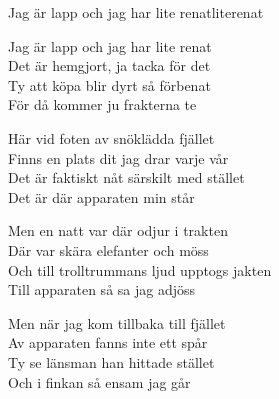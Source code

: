 \begin{song}{Jag är lapp och jag har lite renat}{literenat}
\begin{vers}
Jag är lapp och jag har lite renat\\
Det är hemgjort, ja tacka för det\\
Ty att köpa blir dyrt så förbenat\\
För då kommer ju frakterna te\\
\end{vers}
\begin{vers}
Här vid foten av snöklädda fjället\\
Finns en plats dit jag drar varje vår\\
Det är faktiskt nåt särskilt med stället\\
Det är där apparaten min står\\
\end{vers}
\begin{vers}
Men en natt var där odjur i trakten\\
Där var skära elefanter och möss\\
Och till trolltrummans ljud upptogs jakten\\
Till apparaten så sa jag adjöss\\
\end{vers}
\begin{vers}
Men när jag kom tillbaka till fjället\\
Av apparaten fanns inte ett spår\\
Ty se länsman han hittade stället\\
Och i finkan så ensam jag går\\
\end{vers}
\end{song}
